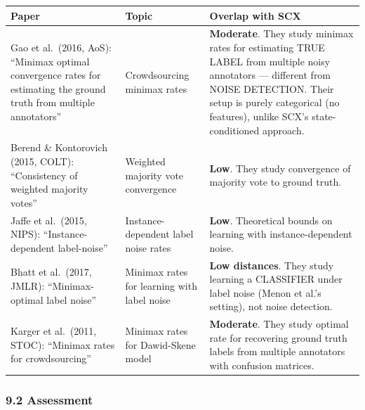 \documentclass[
  12pt,
]{article}
\begin{document}
\begin{longtable}[]{@{}
  >{\raggedright\arraybackslash}p{}
  >{\raggedright\arraybackslash}p{}
  >{\raggedright\arraybackslash}p{}@{}}
\toprule\noalign{}
\begin{minipage}[b]{\linewidth}\raggedright
Paper
\end{minipage} & \begin{minipage}[b]{\linewidth}\raggedright
Topic
\end{minipage} & \begin{minipage}[b]{\linewidth}\raggedright
Overlap with SCX
\end{minipage} \\
\midrule\noalign{}
\endhead
\bottomrule\noalign{}
\endlastfoot
Gao et al.~(2016, AoS): ``Minimax optimal convergence rates for
estimating the ground truth from multiple annotators'' & Crowdsourcing
minimax rates & \textbf{Moderate}. They study minimax rates for
estimating TRUE LABEL from multiple noisy annotators --- different from
NOISE DETECTION. Their setup is purely categorical (no features), unlike
SCX's state-conditioned approach. \\
Berend \& Kontorovich (2015, COLT): ``Consistency of weighted majority
votes'' & Weighted majority vote convergence & \textbf{Low}. They study
convergence of majority vote to ground truth. \\
Jaffe et al.~(2015, NIPS): ``Instance-dependent label-noise'' &
Instance-dependent label noise rates & \textbf{Low}. Theoretical bounds
on learning with instance-dependent noise. \\
Bhatt et al.~(2017, JMLR): ``Minimax-optimal label noise'' & Minimax
rates for learning with label noise & \textbf{Low distances}. They study
learning a CLASSIFIER under label noise (Menon et al.'s setting), not
noise detection. \\
Karger et al.~(2011, STOC): ``Minimax rates for crowdsourcing'' &
Minimax rates for Dawid-Skene model & \textbf{Moderate}. They study
optimal rate for recovering ground truth labels from multiple annotators
with confusion matrices. \\
\end{longtable}

\subsubsection{9.2 Assessment}\label{assessment}
\end{document}
